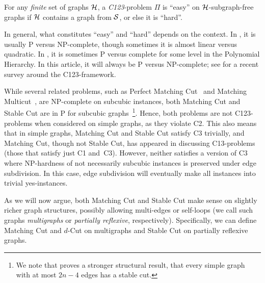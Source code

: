 \documentclass[a4paper,UKenglish,cleveref, autoref,thm-restate]{lipics-v2021}
\begin{document}
\begin{theorem}\label{t-dicho}
For any \emph{finite} set of graphs ${\cal H}$, a \emph{C123}-problem $\Pi$  is ``easy'' on ${\cal H}$-subgraph-free graphs if ${\cal H}$ contains a graph from ${\cal S}$, or else it is ``hard''.
\end{theorem}
\noindent In general, what constitutes ``easy'' and ``hard'' depends on the context. In \cite{JMOPPSL25}, it is usually P versus NP-complete, though sometimes it is almost linear versus quadratic. In \cite{EVMPS24}, it is sometimes P versus complete for some level in the Polynomial Hierarchy. In this article, it will always be P versus NP-complete; see \cite{Leeuwen25} for a recent survey around the C123-framework.

While several related problems, such as
{\sc Perfect Matching Cut}~\cite{LT22} and {\sc Matching Multicut}~\cite{GJMS24}, are NP-complete on subcubic instances, 
both {\sc Matching Cut} and {\sc Stable Cut} are in P for subcubic graphs~\cite{Chvatal1984,Moshi89}\footnote{We note that \cite{CY02} proves a stronger structural result, that every simple graph with at most $2n-4$ edges has a stable cut.}.
Hence, both problems are not C123-problems when considered on simple graphs, as they violate C2. This also means that
in simple graphs, {\sc Matching Cut} and {\sc Stable Cut} satisfy C3 trivially, and {\sc Matching Cut}, though 
not {\sc Stable Cut}, has appeared in \cite{JMPPSL23} discussing C13-problems (those that satisfy just C1 and~C3). However, neither satisfies a version of C3 where NP-hardness of not necessarily subcubic instances is preserved under edge subdivision. In this case, edge subdivision will eventually make all instances into trivial yes-instances.

 As we will now argue, both {\sc Matching Cut} and {\sc Stable Cut} make sense on slightly richer graph structures, possibly allowing multi-edges or self-loops (we call such graphs {\it multigraphs} or {\it partially reflexive}, respectively). Specifically, we can define {\sc Matching Cut} and {\sc $d$-Cut} on multigraphs and {\sc Stable Cut} on partially reflexive graphs. 
\end{document}
